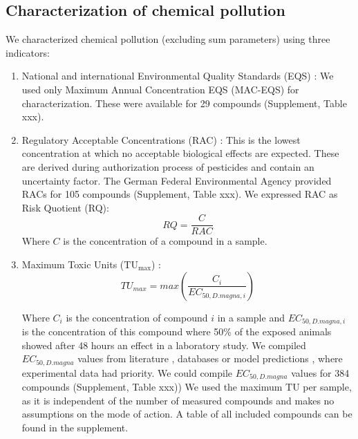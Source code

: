\documentclass[journal=esthag,manuscript=article]{achemso}
\begin{document}
\subsection{Characterization of chemical pollution}
We characterized chemical pollution (excluding sum parameters) using three indicators:

\begin{enumerate}
  \item National and international Environmental Quality Standards (EQS) \citep{ogewv_verordnung_2011,european_union_directive_2013}:
  We used only Maximum Annual Concentration EQS (MAC-EQS) for characterization.
  These were available for 29 compounds (Supplement, Table xxx).

  \item Regulatory Acceptable Concentrations (RAC) \citep{brock_linking_2010}:
  This is the lowest concentration at which no acceptable biological effects are expected. 
  These are derived during authorization  process of pesticides and contain an uncertainty factor.
  The German Federal Environmental Agency provided RACs for 105 compounds (Supplement, Table xxx).  
  We expressed RAC as Risk Quotient (RQ):
  \begin{equation}
  RQ = \frac{C}{RAC}
  \end{equation}
  Where $C$ is the concentration of a compound in a sample.

  \item Maximum Toxic Units ($\mathrm{TU_{max}}$)  \citep{sprague_measurement_1970}: 
  \begin{equation}
  TU_{max} = max(\frac{C_i}{EC_{50, D.magna, i}})
  \end{equation}

  Where $C_i$ is the concentration of compound $i$ in a sample and $EC_{50, D.magna, i}$ is the concentration of this compound where 50\% of the exposed animals showed after 48 hours an effect in a laboratory study.
  We compiled $EC_{50, D.magna}$ values from literature \citep{malaj_organic_2014}, databases \citep{lewis_international_2016,u.s._epa_ecotoxicology_2015} or model predictions \citep{schuurmann_quantitative_2011}, where experimental data had priority.
  We could compile $EC_{50, D.magna}$ values for 384 compounds (Supplement, Table xxx))
  We used the maximum TU per sample, as it is independent of the number of measured compounds and makes no assumptions on the mode of action.
  A table of all included compounds can be found in the supplement.
\end{enumerate}
\end{document}
